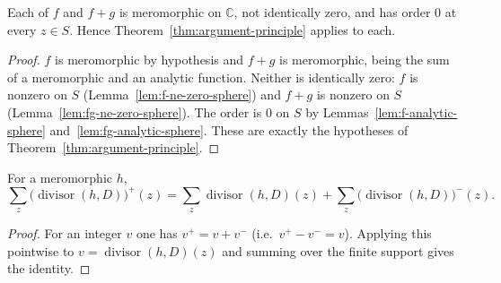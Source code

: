\begin{lemma}
    \label{lem:orderZero-bundle}
    \leanok
    Each of $f$ and $f+g$ is meromorphic on $\mathbb{C}$, not identically zero,
    and has order $0$ at every $z \in S$. Hence
    Theorem~\ref{thm:argument-principle} applies to each.
\end{lemma}
\begin{proof}
    $f$ is meromorphic by hypothesis and $f+g$ is meromorphic, being the sum of a
    meromorphic and an analytic function. Neither is identically zero: $f$ is
    nonzero on $S$ (Lemma~\ref{lem:f-ne-zero-sphere}) and $f+g$ is nonzero on $S$
    (Lemma~\ref{lem:fg-ne-zero-sphere}). The order is $0$ on $S$ by
    Lemmas~\ref{lem:f-analytic-sphere} and~\ref{lem:fg-analytic-sphere}. These are
    exactly the hypotheses of Theorem~\ref{thm:argument-principle}.
\end{proof}

\begin{lemma}
    \label{lem:posPart-mass-decomp}
    \leanok
    For a meromorphic $h$,
    \[
        \sum_z \big(\operatorname{divisor}(h,D)\big)^{+}(z)
          = \sum_z \operatorname{divisor}(h,D)(z)
          + \sum_z \big(\operatorname{divisor}(h,D)\big)^{-}(z).
    \]
\end{lemma}
\begin{proof}
    For an integer $v$ one has $v^{+} = v + v^{-}$ (i.e.\
    $v^{+} - v^{-} = v$). Applying this pointwise to
    $v = \operatorname{divisor}(h,D)(z)$ and summing over the finite support gives
    the identity.
\end{proof}

